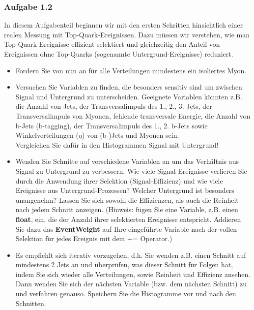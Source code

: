\subsubsection{Aufgabe 1.2}
In diesem Aufgabenteil beginnen wir mit den ersten Schritten hinsichtlich einer realen Messung mit Top-Quark-Ereignissen. Dazu m\"ussen wir verstehen, wie man Top-Quark-Ereignisse effizient selektiert und gleichzeitig den Anteil von Ereignissen ohne Top-Quarks (sogenannte Untergrund-Ereignisse) reduziert.
\begin{itemize}
        \item Fordern Sie von nun an f\"ur alle Verteilungen mindestens ein isoliertes Myon.
	\item Versuchen Sie Variablen zu finden, die besonders sensitiv sind um zwischen Signal und Untergrund zu unterscheiden. Geeignete Variablen k\"onnten z.B. die Anzahl von Jets, der Transversalimpuls des 1., 2., 3. Jets, der Transversalimpuls von Myonen, fehlende transversale Energie, die Anzahl von b-Jets (b-tagging), der Transversalimpuls des 1., 2. b-Jets sowie Winkelverteilungen ($\eta$) von (b-)Jets und Myonen sein. \\
	 Vergleichen Sie daf\"ur in den Histogrammen Signal mit Untergrund!
	\item Wenden Sie Schnitte auf verschiedene Variablen an um das Verh\"altnis aus Signal zu Untergrund zu verbessern. Wie viele Signal-Ereignisse verlieren Sie durch die Anwendung ihrer Selektion (Signal-Effizienz) und wie viele Ereignisse aus Untergrund-Prozessen? Welcher Untergrund ist besonders unangenehm? Lassen Sie sich sowohl die Effizienzen, als auch die Reinheit nach jedem Schnitt anzeigen. (Hinweis: f\"ugen Sie eine Variable, z.B. einen \textbf{float}, ein, die der Anzahl ihrer selektierten Ereignisse entspricht. Addieren Sie dazu das \textbf{Event\-Weight} auf Ihre eingef\"uhrte Variable nach der vollen Selektion f\"ur jedes Ereignis mit dem \grqq{}+=\grqq{} Operator.)
        \item Es empfiehlt sich iterativ vorzugehen, d.h. Sie wenden z.B. einen Schnitt auf mindestens 2 Jets an und \"uberpr\"ufen, was dieser Schnitt f\"ur Folgen hat, indem Sie sich wieder alle Verteilungen, sowie Reinheit und Effizienz ansehen. Dann wenden Sie sich der n\"achsten Variable (bzw. dem n\"achsten Schnitt) zu und verfahren genauso. Speichern Sie die Histogramme vor und nach den Schnitten. \\
\end{itemize}

